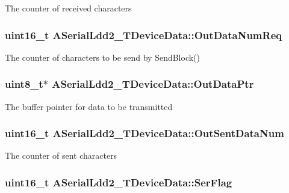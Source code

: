 The counter of received characters \hypertarget{struct_a_serial_ldd2___t_device_data_ac460a80b8506535c36fa730e3a61283d}{
\subsubsection[{Out\-Data\-Num\-Req}]{\setlength{\rightskip}{0pt plus 5cm}uint16\-\_\-t A\-Serial\-Ldd2\-\_\-\-T\-Device\-Data\-::\-Out\-Data\-Num\-Req}}\label{struct_a_serial_ldd2___t_device_data_ac460a80b8506535c36fa730e3a61283d}
The counter of characters to be send by Send\-Block() \hypertarget{struct_a_serial_ldd2___t_device_data_ab4427d30f2614d2947ac957aa5eb9165}{
\subsubsection[{Out\-Data\-Ptr}]{\setlength{\rightskip}{0pt plus 5cm}uint8\-\_\-t$\ast$ A\-Serial\-Ldd2\-\_\-\-T\-Device\-Data\-::\-Out\-Data\-Ptr}}\label{struct_a_serial_ldd2___t_device_data_ab4427d30f2614d2947ac957aa5eb9165}
The buffer pointer for data to be transmitted \hypertarget{struct_a_serial_ldd2___t_device_data_a80df4c32d72ab149e6dbfb99b41c14f2}{
\subsubsection[{Out\-Sent\-Data\-Num}]{\setlength{\rightskip}{0pt plus 5cm}uint16\-\_\-t A\-Serial\-Ldd2\-\_\-\-T\-Device\-Data\-::\-Out\-Sent\-Data\-Num}}\label{struct_a_serial_ldd2___t_device_data_a80df4c32d72ab149e6dbfb99b41c14f2}
The counter of sent characters \hypertarget{struct_a_serial_ldd2___t_device_data_a3a23d8d86c35f325643a62974866594f}{
\subsubsection[{Ser\-Flag}]{\setlength{\rightskip}{0pt plus 5cm}uint16\-\_\-t A\-Serial\-Ldd2\-\_\-\-T\-Device\-Data\-::\-Ser\-Flag}}\label{struct_a_serial_ldd2___t_device_data_a3a23d8d86c35f325643a62974866594f}
